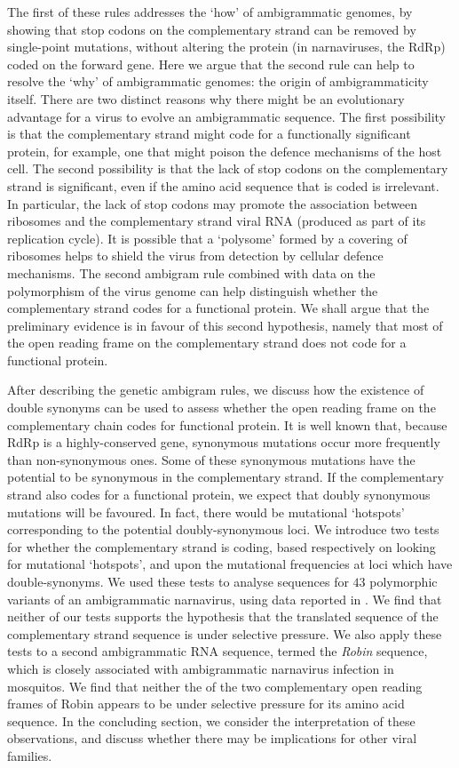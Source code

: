 \documentclass[9pt,lineno]{elife}
\begin{document}
The first of these rules addresses the \lq how' of  ambigrammatic genomes, by showing that 
stop codons on the complementary strand can be removed by single-point mutations, without 
altering the protein (in narnaviruses, the RdRp) coded on the forward gene. Here we argue that the 
second rule can help to resolve the \lq why' of ambigrammatic genomes: 
the origin of ambigrammaticity itself. There are two 
distinct reasons why there might be an evolutionary advantage for a virus to evolve an 
ambigrammatic sequence. The first possibility is that the complementary strand might code 
for a functionally significant protein, for example, one that might poison the defence mechanisms 
of the host cell. The second possibility is that the lack of stop codons on the complementary strand 
is significant, even if the amino acid sequence that is coded is irrelevant. In particular, the lack of stop codons 
may promote the association between ribosomes and the complementary strand viral RNA (produced as part of its 
replication cycle). It is possible that 
a \lq polysome' formed by a covering of ribosomes helps to shield 
the virus from detection by cellular defence mechanisms. The second ambigram rule combined
with data on the polymorphism of the 
virus genome can help distinguish whether the complementary strand codes for a functional protein. 
We shall argue that the preliminary evidence is in favour of this second hypothesis, namely that 
most of the open reading frame on the complementary strand does not code for a functional
protein.

After describing the genetic ambigram rules, we discuss how the existence of double synonyms 
can be used to assess whether the open reading frame on the complementary chain codes for 
functional protein. It is well known that, because RdRp is a highly-conserved gene, synonymous 
mutations occur more frequently than non-synonymous ones. Some of these synonymous 
mutations have the potential to be synonymous in the complementary strand. If the complementary 
strand also codes for a functional protein, we expect that doubly synonymous mutations will be 
favoured. In fact, there would be mutational \lq hotspots' corresponding to the potential 
doubly-synonymous loci. We introduce two tests for whether the complementary strand 
is coding, based respectively on looking for mutational \lq hotspots', and upon the mutational
frequencies at loci which have double-synonyms. We used these tests to analyse sequences for 
$43$ polymorphic variants of an ambigrammatic narnavirus, using data reported in \cite{Bat+20}. 
We find that neither of our tests supports the hypothesis that the translated sequence of the 
complementary strand sequence 
is under selective pressure. We also apply these tests to a second ambigrammatic RNA sequence, 
termed the \emph{Robin} sequence, which is closely associated with ambigrammatic narnavirus infection 
in mosquitos. We find that neither the of the two complementary open reading frames 
of Robin appears to be under selective pressure for its amino acid sequence. 
In the concluding section, we consider the interpretation of these observations, and discuss whether there 
may be implications for other viral families.
\end{document}
